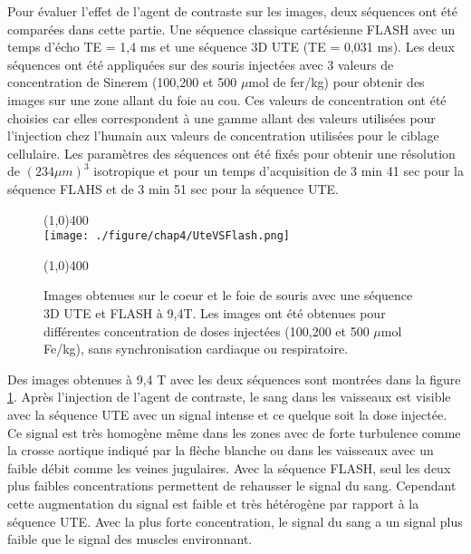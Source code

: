 Pour évaluer l'effet de l'agent de contraste sur les images, deux séquences ont été comparées dans cette partie. Une séquence classique cartésienne FLASH avec un temps d'écho TE = 1,4 ms et une séquence 3D UTE (TE = 0,031 ms). Les deux séquences ont été appliquées sur des souris injectées avec 3 valeurs de concentration de Sinerem (100,200 et 500 $\mu$mol de fer/kg) pour obtenir des images sur une zone allant du foie au cou. Ces valeurs de concentration ont été choisies car elles correspondent à une gamme allant des valeurs utilisées pour l'injection chez l'humain aux valeurs de concentration utilisées pour le ciblage cellulaire.
Les paramètres des séquences ont été fixés pour obtenir une résolution de $(234\mu m)^3$ isotropique et pour un temps d'acquisition de 3 min 41 sec pour la séquence FLAHS et de 3 min 51 sec pour la séquence UTE.

\begin{figure}[H]
\centering
\line(1,0){400} \\
\texttt{[image: ./figure/chap4/UteVSFlash.png]}
\caption[UTE vs Flash]{\label{fig:UteVSFlash} Images obtenues sur le coeur et le foie de souris avec une séquence 3D UTE et FLASH à 9,4T. Les images ont été obtenues pour différentes concentration de doses injectées (100,200 et 500 $\mu$mol Fe/kg), sans synchronisation cardiaque ou respiratoire.}
\line(1,0){400} \\ 
\end{figure}

Des images obtenues à 9,4 T avec les deux séquences sont montrées dans la figure \ref{fig:UteVSFlash}. Après l'injection de l'agent de contraste, le sang dans les vaisseaux est visible avec la séquence UTE avec un signal intense et ce quelque soit la dose injectée. Ce signal est très homogène même dans les zones avec de forte turbulence comme la crosse aortique indiqué par la flèche blanche ou dans les vaisseaux avec un faible débit comme les veines jugulaires. Avec la séquence FLASH, seul les deux plus faibles concentrations permettent de rehausser le signal du sang. Cependant cette augmentation du signal est faible et très hétérogène par rapport à la séquence UTE. Avec la plus forte concentration, le signal du sang a un signal plus faible que le signal des muscles environnant.

